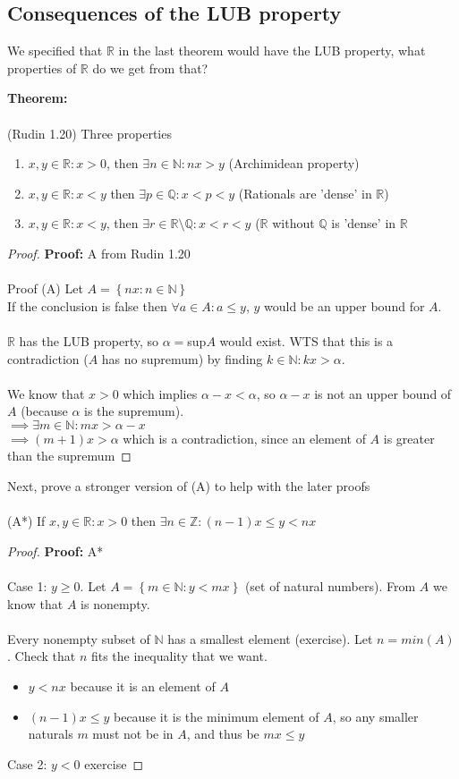 \documentclass{article}
\newcommand{\Z}{\mathbb{Z}}
\newcommand{\R}{\mathbb{R}}
\newcommand{\Q}{\mathbb{Q}}
\newcommand{\N}{\mathbb{N}}
\begin{document}
\subsection{Consequences of the LUB property}
We specified that $\R$ in the last theorem would have the LUB property, what properties of $\R$ do we get from that?
\begin{theorem} 
\textbf{Theorem:} {\color{blue} } \\
~\\
(Rudin 1.20) Three properties
\begin{enumerate}
	\item $x,y\in\R: x>0$, then $\exists n\in\N: nx>y$ (Archimidean property) 
	\item $x,y\in\R: x<y$ then $\exists p\in\Q: x<p<y$ (Rationals are 'dense' in $\R$)
	\item $x,y\in\R: x<y$, then $\exists r \in \R\setminus\Q: x<r<y$ ($\R$ without $\Q$ is 'dense' in $\R$
\end{enumerate}
\end{theorem}
\begin{proof} 
\textbf{Proof:} A from Rudin 1.20 \\
~\\
Proof (A) Let $A = \left\{nx: n\in\N \right\}$ \\
If the conclusion is false then $\forall a\in A: a\le y$, $y$ would be an upper bound for $A$. \\
~\\
$\R$ has the LUB property, so $\alpha = $sup$A$ would exist. WTS that this is a contradiction ($A$ has no supremum) by finding $k\in\N: kx > \alpha$.  \\
~\\
We know that $x>0$ which implies $\alpha - x < \alpha$, so $\alpha -x$ is not an upper bound of $A$ (because $\alpha$ is the supremum). \\
$\implies \exists m\in\N: mx > \alpha - x$ \\
$\implies (m+1)x > \alpha$ which is a contradiction, since an element of $A$ is greater than the supremum
\end{proof}
Next, prove a stronger version of (A) to help with the later proofs \\
~\\
(A*) If $x,y\in\R: x>0$ then $\exists n\in\Z: (n-1)x \le y < nx$
\begin{proof} 
\textbf{Proof:} A* \\
~\\
Case 1: $y\ge 0$. Let $A = \left\{ m\in\N: y<mx \right\}$ (set of natural numbers). From $A$ we know that $A$ is nonempty. \\
~\\
Every nonempty subset of $\N$ has a smallest element (exercise). Let $n = min(A)$. Check that $n$ fits the inequality that we want.
\begin{itemize}
	\item $y <nx$ because it is an element of $A$
	\item $(n-1)x \le y$ because it is the minimum element of $A$, so any smaller naturals $m$ must not be in $A$, and thus be $mx\le y$
\end{itemize}
Case 2: $y<0$ exercise
\end{proof}
\end{document}
